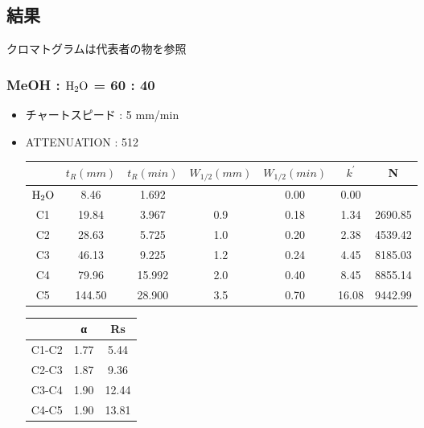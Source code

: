 \documentclass[a4paper,papersize,dvipdfmx]{jsarticle}
\begin{document}
\subsection*{結果}
クロマトグラムは代表者の物を参照

\subsubsection*{MeOH : $\rm H_2O$ = 60 : 40}

\begin{itemize}
\item チャートスピード : 5 mm/min
\item ATTENUATION : 512

\begin{table}[H]
\begin{center}
\begin{tabular}{|c|c|c|c|c|c|c|}
\hline
&  $t_R(mm)$ & $t_R(min)$ & $W_{1/2}(mm)$ & $W_{1/2}(min)$ & $k^\prime$   & N    \\ \hline
$\rm H_2O$      & 8.46      & 1.692          &                 & 0.00 & 0.00  &  \\ \hline
C1       & 19.84     & 3.967          & 0.9             & 0.18 & 1.34  & 2690.85  \\ \hline
C2       & 28.63     & 5.725          & 1.0             & 0.20 & 2.38  & 4539.42  \\ \hline
C3       & 46.13     & 9.225          & 1.2             & 0.24 & 4.45  & 8185.03  \\ \hline
C4       & 79.96     & 15.992         & 2.0             & 0.40 & 8.45  & 8855.14  \\ \hline
C5       & 144.50    & 28.900         & 3.5             & 0.70 & 16.08 & 9442.99  \\ \hline
\end{tabular}
\end{center}
\end{table}

\begin{table}[H]
\begin{center}
\begin{tabular}{|c|c|c|}
\hline
& α     & Rs         \\ \hline
C1-C2 & 1.77 & 5.44  \\ \hline
C2-C3 & 1.87 & 9.36  \\ \hline
C3-C4 & 1.90 & 12.44 \\ \hline
C4-C5 & 1.90 & 13.81 \\ \hline
\end{tabular}
\end{center}
\end{table}

\end{itemize}
\end{document}
